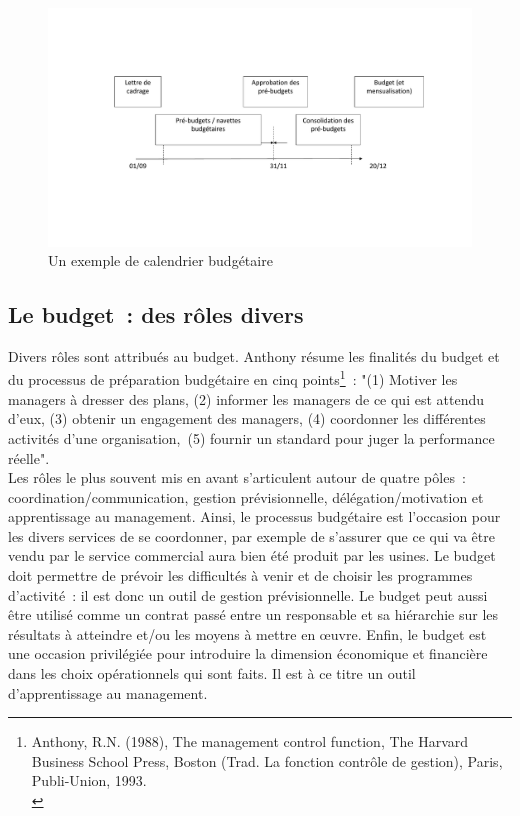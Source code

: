 \documentclass{tufte-handout}
\begin{document}
\begin{figure}[htbp]
\centering
\includegraphics[width=.9\linewidth]{./img/budgetcal.pdf}
\caption{Un exemple de calendrier budgétaire}
\end{figure}
\subsection{Le budget : des rôles divers}
\label{sec:org01433f2}
Divers rôles sont attribués au budget. Anthony résume les finalités du budget et du processus de préparation budgétaire en cinq points\footnote{Anthony, R.N. (1988), The management control function, The Harvard Business School Press, Boston (Trad. La fonction contrôle de gestion), Paris, Publi-Union, 1993.\\} : "(1) Motiver les managers à dresser des plans, (2) informer les managers de ce qui est attendu d'eux, (3) obtenir un engagement des managers, (4) coordonner les différentes activités d'une organisation, (5) fournir un standard pour juger la performance réelle".\\
Les rôles le plus souvent mis en avant s'articulent autour de quatre pôles : coordination/communication, gestion prévisionnelle, délégation/motivation et apprentissage au management. Ainsi, le processus budgétaire est l'occasion pour les divers services de se coordonner, par exemple de s'assurer que ce qui va être vendu par le service commercial aura bien été produit par les usines. Le budget doit permettre de prévoir les difficultés à venir et de choisir les programmes d'activité : il est donc un outil de gestion prévisionnelle. Le budget peut aussi être utilisé comme un contrat passé entre un responsable et sa hiérarchie sur les résultats à atteindre et/ou les moyens à mettre en œuvre. Enfin, le budget est une occasion privilégiée pour introduire la dimension économique et financière dans les choix opérationnels qui sont faits. Il est à ce titre un outil d'apprentissage au management.\\
\end{document}

